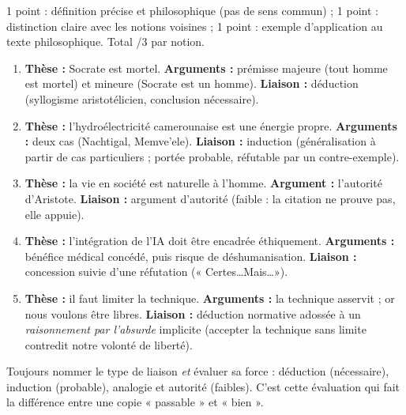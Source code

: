 \documentclass[11pt]{article}
\newcommand{\cle}[1]{{\popxbold\color{popdark}#1}}
\begin{document}
\begin{methode}
1 point : définition précise et philosophique (pas de sens commun) ; 1 point : distinction claire avec les notions voisines ; 1 point : exemple d'application au texte philosophique. Total /3 par notion.
\end{methode}

\begin{corrige}
\begin{enumerate}
    \item \textbf{Thèse :} Socrate est mortel. \textbf{Arguments :} prémisse majeure (tout homme est mortel) et mineure (Socrate est un homme). \textbf{Liaison :} \cle{déduction} (syllogisme aristotélicien, conclusion nécessaire).
    \item \textbf{Thèse :} l'hydroélectricité camerounaise est une énergie propre. \textbf{Arguments :} deux cas (Nachtigal, Memve'ele). \textbf{Liaison :} \cle{induction} (généralisation à partir de cas particuliers ; portée probable, réfutable par un contre-exemple).
    \item \textbf{Thèse :} la vie en société est naturelle à l'homme. \textbf{Argument :} l'autorité d'Aristote. \textbf{Liaison :} \cle{argument d'autorité} (faible : la citation ne prouve pas, elle appuie).
    \item \textbf{Thèse :} l'intégration de l'IA doit être encadrée éthiquement. \textbf{Arguments :} bénéfice médical concédé, puis risque de déshumanisation. \textbf{Liaison :} \cle{concession} suivie d'une réfutation (« Certes\dots Mais\dots »).
    \item \textbf{Thèse :} il faut limiter la technique. \textbf{Arguments :} la technique asservit ; or nous voulons être libres. \textbf{Liaison :} \cle{déduction} normative adossée à un \emph{raisonnement par l'absurde} implicite (accepter la technique sans limite contredit notre volonté de liberté).
\end{enumerate}
\end{corrige}

\begin{attention}
Toujours nommer le type de liaison \emph{et} évaluer sa force : déduction (nécessaire), induction (probable), analogie et autorité (faibles). C'est cette évaluation qui fait la différence entre une copie « passable » et « bien ».
\end{attention}
\end{document}
